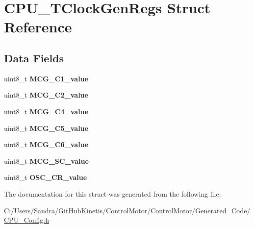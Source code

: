 \hypertarget{struct_c_p_u___t_clock_gen_regs}{}\section{C\+P\+U\+\_\+\+T\+Clock\+Gen\+Regs Struct Reference}
\label{struct_c_p_u___t_clock_gen_regs}
\subsection*{Data Fields}
\begin{DoxyCompactItemize}
\item 
uint8\+\_\+t {\bfseries M\+C\+G\+\_\+\+C1\+\_\+value}\hypertarget{struct_c_p_u___t_clock_gen_regs_a0623717069c64cb9a8a16214b8038a83}{}\label{struct_c_p_u___t_clock_gen_regs_a0623717069c64cb9a8a16214b8038a83}

\item 
uint8\+\_\+t {\bfseries M\+C\+G\+\_\+\+C2\+\_\+value}\hypertarget{struct_c_p_u___t_clock_gen_regs_a70484782980e1c451a35a977f02bb52f}{}\label{struct_c_p_u___t_clock_gen_regs_a70484782980e1c451a35a977f02bb52f}

\item 
uint8\+\_\+t {\bfseries M\+C\+G\+\_\+\+C4\+\_\+value}\hypertarget{struct_c_p_u___t_clock_gen_regs_ace7ef0317dd9af4a907f2631d46009ab}{}\label{struct_c_p_u___t_clock_gen_regs_ace7ef0317dd9af4a907f2631d46009ab}

\item 
uint8\+\_\+t {\bfseries M\+C\+G\+\_\+\+C5\+\_\+value}\hypertarget{struct_c_p_u___t_clock_gen_regs_aaa173fd296e5d928287cfe7e76e79de0}{}\label{struct_c_p_u___t_clock_gen_regs_aaa173fd296e5d928287cfe7e76e79de0}

\item 
uint8\+\_\+t {\bfseries M\+C\+G\+\_\+\+C6\+\_\+value}\hypertarget{struct_c_p_u___t_clock_gen_regs_a6f06a196d123bf9749a133782d1b6b5d}{}\label{struct_c_p_u___t_clock_gen_regs_a6f06a196d123bf9749a133782d1b6b5d}

\item 
uint8\+\_\+t {\bfseries M\+C\+G\+\_\+\+S\+C\+\_\+value}\hypertarget{struct_c_p_u___t_clock_gen_regs_ac4f9b14d13d783b5bae7c3e1f9173174}{}\label{struct_c_p_u___t_clock_gen_regs_ac4f9b14d13d783b5bae7c3e1f9173174}

\item 
uint8\+\_\+t {\bfseries O\+S\+C\+\_\+\+C\+R\+\_\+value}\hypertarget{struct_c_p_u___t_clock_gen_regs_a740f62848c23ff6b809a65a02bf6c463}{}\label{struct_c_p_u___t_clock_gen_regs_a740f62848c23ff6b809a65a02bf6c463}

\end{DoxyCompactItemize}


The documentation for this struct was generated from the following file\+:\begin{DoxyCompactItemize}
\item 
C\+:/\+Users/\+Sandra/\+Git\+Hub\+Kinetis/\+Control\+Motor/\+Control\+Motor/\+Generated\+\_\+\+Code/\hyperlink{_c_p_u___config_8h}{C\+P\+U\+\_\+\+Config.\+h}\end{DoxyCompactItemize}

